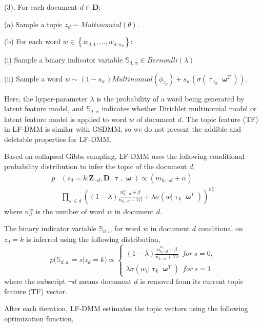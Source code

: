 \documentclass[10pt,journal,compsoc]{IEEEtran}
\begin{document}
(3). For each document $d \in \bm{D}$:

    \qquad (a) Sample a topic $z_d \sim Multinomial(\theta)$.

    \qquad (b) For each word $w\in\left\{w_{d,1},...,w_{d,n_d}\right\}$:
           
           \qquad\qquad (i) Sample a binary indicator variable $\mathbb{S}_{d,w} \in Bernoulli(\lambda)$

           \qquad\qquad (ii) Sample a word $w \sim (1-s_w)Multinomial(\phi_{z_d}) + s_w(\sigma(\uptau_{z_d}\bm{\upomega}^T))$.

Here, the hyper-parameter $\lambda$ is the probability of a word being generated by latent feature model, and $\mathbb{S}_{d,w}$ indicates whether Dirichlet multinomial model or latent feature model is applied to word $w$ of document $d$. The topic feature (TF) in LF-DMM is similar with GSDMM, so we do not present the addible and deletable properties for LF-DMM.

Based on collapsed Gibbs sampling, LF-DMM uses the following conditional probability distribution to infer the topic of the document $d$, 
\begin{equation} \label{lfdmm_z}
\begin{split}
p&(z_d=k|\bm{Z}_{\neg d},\bm{D},\uptau,\bm{\upomega}) \propto(m_{k,\neg d}+\alpha)\\
&\prod_{w\in d}((1-\lambda)\frac{n_{k,\neg{d}}^w + \beta}{n_{k,\neg{d}}+V\beta} + \lambda \sigma(w|\uptau_k\bm{\upomega}^T))^{n_d^w}
\end{split}
\end{equation}
where $n_d^w$ is the number of word $w$ in document $d$.

The binary indicator variable $\mathbb{S}_{d,w}$ for word $w$ in document $d$ conditional on $z_d=k$ is inferred using the following distribution,
\begin{equation} \label{lfdmm_b}
p({\mathbb{S}_{d,w}=s|z_d=k)}\propto
\begin{cases}
(1-\lambda)\frac{n_{k, \neg d}^{w_i}+\beta }{{n_{k,\neg d}+V\beta}} \ \ for \  s=0,\\
\lambda \sigma(w_i|{\uptau_k}\bm{\upomega}^T) \ \ for \ s=1.
\end{cases}
\end{equation}
where the subscript $\neg{d}$ means document $d$ is removed from its current topic feature (TF) vector.

After each iteration, LF-DMM estimates the topic vectors using the following optimization function,
\end{document}

